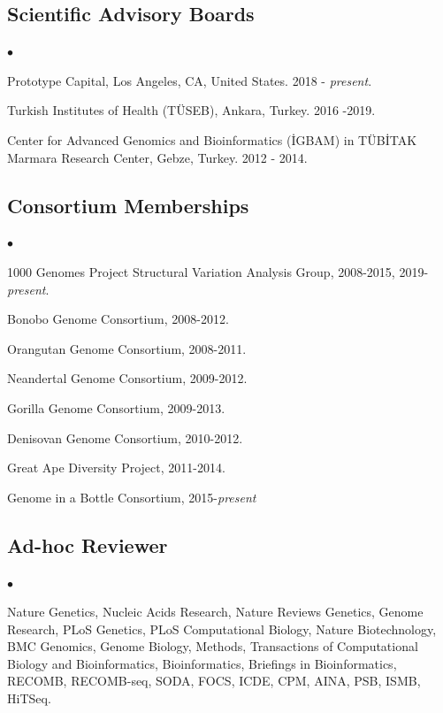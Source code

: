 \documentclass[margin,line]{res}
\newenvironment{list2}{
  \begin{list}{$\bullet$}{%
      \setlength{\itemsep}{0.1cm}
      \setlength{\parsep}{0in} \setlength{\parskip}{0in}
      \setlength{\topsep}{0in} \setlength{\partopsep}{0in} 
      \setlength{\leftmargin}{0.2in}}}{\end{list}}
\begin{document}
\begin{resume}
\subsection{\small \sc Scientific Advisory Boards}
\begin{list2}
\item
  Prototype Capital, Los Angeles, CA, United States. 2018 - {\it present}.
\item
  Turkish Institutes of Health (TÜSEB), Ankara, Turkey. 2016 -2019.
\item
  Center for Advanced Genomics and Bioinformatics (\.{I}GBAM)
  in T\"{U}B\.{I}TAK Marmara Research Center, Gebze, Turkey. 2012 - 2014.
\end{list2}

\clearpage
\vspace{-0.4cm}
\subsection{\small \sc Consortium Memberships}

\begin{list2}
\item
  1000 Genomes Project Structural Variation Analysis Group, 2008-2015, 2019-\textit{present}.
\item
  Bonobo Genome Consortium, 2008-2012.
\item
  Orangutan Genome Consortium, 2008-2011.
\item
  Neandertal Genome Consortium, 2009-2012.
\item
  Gorilla Genome Consortium, 2009-2013.
\item
  Denisovan Genome Consortium, 2010-2012.
\item
  Great Ape Diversity Project, 2011-2014.
\item
  Genome in a Bottle Consortium, 2015-{\it present}
\end{list2}


\vspace{-0.4cm}
\subsection{\small \sc Ad-hoc Reviewer}
\begin{list2}
\item
  Nature Genetics, Nucleic Acids Research, Nature Reviews Genetics, Genome Research, PLoS Genetics, PLoS Computational Biology, 
  Nature Biotechnology, BMC Genomics, Genome Biology, Methods, Transactions of Computational Biology and Bioinformatics,
  Bioinformatics, Briefings in Bioinformatics, RECOMB, RECOMB-seq, SODA, FOCS, ICDE, CPM, AINA, PSB, ISMB, HiTSeq.
\end{list2}


\end{resume}
\end{document}
